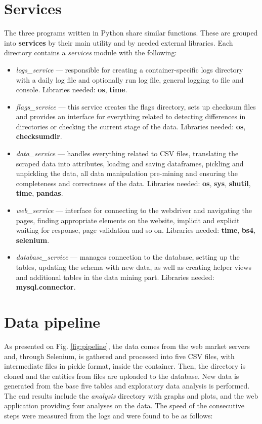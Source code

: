 \section{Services}
The three programs written in Python share similar functions. These are grouped into \textbf{services} by their main utility and by needed external libraries. Each directory contains a \textit{services} module with the following:
\begin{itemize}
    \setlength\itemsep{0.3em}
    \item \textit{logs\_service} --- responsible for creating a container-specific logs directory with a daily log file and optionally run log file, general logging to file and console. Libraries needed: \textbf{os}, \textbf{time}.
    \item \textit{flags\_service} --- this service creates the flags directory, sets up checksum files and provides an interface for everything related to detecting differences in directories or checking the current stage of the data. Libraries needed: \textbf{os}, \textbf{checksumdir}.
    \item \textit{data\_service} --- handles everything related to CSV files, translating the scraped data into attributes, loading and saving dataframes, pickling and unpickling the data, all data manipulation pre-mining and ensuring the completeness and correctness of the data. Libraries needed: \textbf{os}, \textbf{sys}, \textbf{shutil}, \textbf{time}, \textbf{pandas}.
    \item \textit{web\_service} --- interface for connecting to the webdriver and navigating the pages, finding appropriate elements on the website, implicit and explicit waiting for response, page validation and so on. Libraries needed: \textbf{time}, \textbf{bs4}, \textbf{selenium}.
    \item \textit{database\_service} --- manages connection to the database, setting up the tables, updating the schema with new data, as well as creating helper views and additional tables in the data mining part. Libraries needed: \textbf{mysql.connector}.
\end{itemize}

\section{Data pipeline}
As presented on Fig. \ref{fig:pipeline}, the data comes from the web market servers and, through Selenium, is gathered and processed into five CSV files, with intermediate files in pickle format, inside the container. Then, the directory is cloned and the entities from files are uploaded to the database. New data is generated from the base five tables and exploratory data analysis is performed. The end results include the \textit{analysis} directory with graphs and plots, and the web application providing four analyses on the data.
The speed of the consecutive steps were measured from the logs and were found to be as follows:

